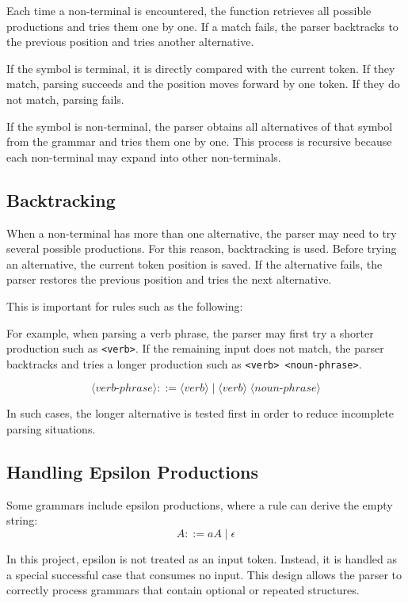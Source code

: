 \documentclass[12pt,a4paper]{article}
\begin{document}
	Each time a non-terminal is encountered, the function retrieves all possible productions and tries them one by one. If a match fails, the parser backtracks to the previous position and tries another alternative.
	
	If the symbol is terminal, it is directly compared with the current token. If they match, parsing succeeds and the position moves forward by one token. If they do not match, parsing fails.
	
	If the symbol is non-terminal, the parser obtains all alternatives of that symbol from the grammar and tries them one by one. This process is recursive because each non-terminal may expand into other non-terminals.
	
	\subsection{Backtracking}
	When a non-terminal has more than one alternative, the parser may need to try several possible productions. For this reason, backtracking is used. Before trying an alternative, the current token position is saved. If the alternative fails, the parser restores the previous position and tries the next alternative.
	
	This is important for rules such as the following:
	
	For example, when parsing a verb phrase, the parser may first try a shorter production such as \texttt{<verb>}. If the remaining input does not match, the parser backtracks and tries a longer production such as \texttt{<verb> <noun-phrase>}.
	
	\[
	\langle verb\mbox{-}phrase \rangle ::= \langle verb \rangle \; | \; \langle verb \rangle \; \langle noun\mbox{-}phrase \rangle
	\]
	
	In such cases, the longer alternative is tested first in order to reduce incomplete parsing situations.
	
	\subsection{Handling Epsilon Productions}
	Some grammars include epsilon productions, where a rule can derive the empty string:
	\[
	A ::= aA \; | \; \epsilon
	\]
	
	In this project, epsilon is not treated as an input token. Instead, it is handled as a special successful case that consumes no input. This design allows the parser to correctly process grammars that contain optional or repeated structures.
	
\end{document}
